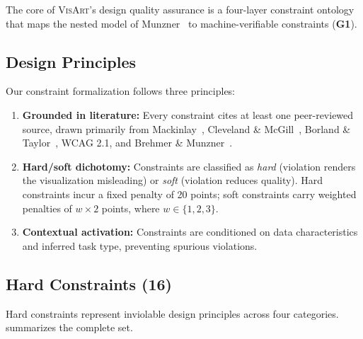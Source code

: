 \documentclass[final,5p,times,twocolumn]{elsarticle}
\newcommand{\sysname}{\textsc{VisArt}}
\begin{document}
The core of \sysname{}'s design quality assurance is a four-layer constraint ontology that maps the nested model of Munzner~\cite{munzner2014visualization} to machine-verifiable constraints (\textbf{G1}).

\subsection{Design Principles}

Our constraint formalization follows three principles:

\begin{enumerate}
  \item \textbf{Grounded in literature:} Every constraint cites at least one peer-reviewed source, drawn primarily from Mackinlay~\cite{mackinlay1986automating}, Cleveland \& McGill~\cite{cleveland1984graphical}, Borland \& Taylor~\cite{borland2007rainbow}, WCAG 2.1, and Brehmer \& Munzner~\cite{brehmer2013multi}.
  \item \textbf{Hard/soft dichotomy:} Constraints are classified as \textit{hard} (violation renders the visualization misleading) or \textit{soft} (violation reduces quality). Hard constraints incur a fixed penalty of 20 points; soft constraints carry weighted penalties of $w \times 2$ points, where $w \in \{1,2,3\}$.
  \item \textbf{Contextual activation:} Constraints are conditioned on data characteristics and inferred task type, preventing spurious violations.
\end{enumerate}

\subsection{Hard Constraints (16)}

Hard constraints represent inviolable design principles across four categories.
 summarizes the complete set.
\end{document}
